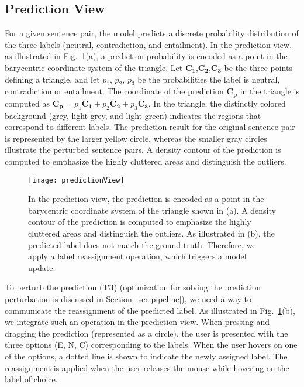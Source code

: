 
\subsection{Prediction View}
\label{sec:prediction}
For a given sentence pair, the model predicts a discrete probability distribution of the three labels (neutral, contradiction, and entailment).
%
In the prediction view, as illustrated in Fig.~\ref{fig:predictionView}(a), a prediction probability is encoded as a point in the barycentric coordinate system of the triangle.
Let $\mathbf{C_1}$,$\mathbf{C_2}$,$\mathbf{C_3}$ be the three points defining a triangle, and let $p_1$, $p_2$, $p_3$ be the probabilities the label is neutral, contradiction or entailment. The coordinate of the prediction $\mathbf{C_p}$ in the triangle is computed as $\mathbf{C_p} = p_1\mathbf{C_1}+p_2\mathbf{C_2}+p_3\mathbf{C_3}$.
In the triangle, the distinctly colored background (grey, light grey, and light green) indicates the regions that correspond to different labels. The prediction result for the original sentence pair is represented by the larger yellow circle, whereas the smaller gray circles illustrate the perturbed sentence pairs. A density contour of the prediction is computed to emphasize the highly cluttered areas and distinguish the outliers.

\begin{figure}[htbp]
\centering
\vspace{-2mm}
 \texttt{[image: predictionView]}
 \vspace{-5mm}
 \caption{
In the prediction view, the prediction is encoded as a point in the barycentric coordinate system of the triangle shown in (a).
A density contour of the prediction is computed to emphasize the highly cluttered areas and distinguish the outliers.
As illustrated in (b), the predicted label does not match the ground truth. Therefore, we apply a label reassignment operation, which triggers a model update.
 }
  \vspace{-2mm}
\label{fig:predictionView}
\end{figure}

To perturb the prediction (\textbf{T3}) (optimization for solving the prediction perturbation is discussed in Section~\ref{sec:pipeline}), we need a way to communicate the reassignment of the predicted label. As illustrated in Fig.~\ref{fig:predictionView}(b), we integrate such an operation in the prediction view. When pressing and dragging the prediction (represented as a circle), the user is presented with the three options (E, N, C) corresponding to the labels. When the user hovers on one of the options, a dotted line is shown to indicate the newly assigned label. The reassignment is applied when the user releases the mouse while hovering on the label of choice.
